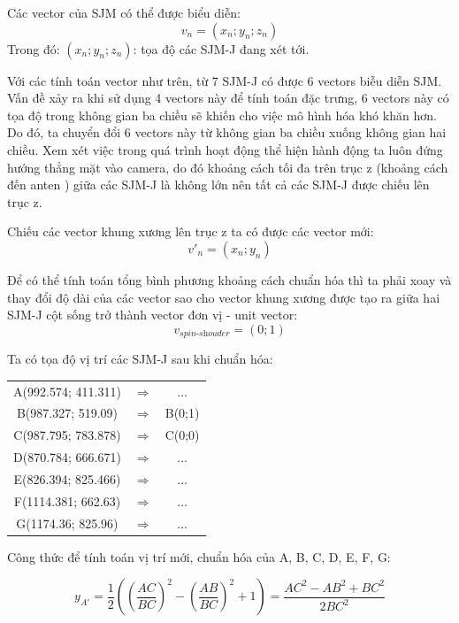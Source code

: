 Các vector của SJM có thể được biểu diễn:
\begin{equation}
v_n=(x_n; y_n; z_n)
\end{equation}
Trong đó: $(x_n; y_n; z_n)$: tọa độ các SJM-J đang xét tới.

Với các tính toán vector như trên, từ 7 SJM-J có được 6 vectors biễu diễn SJM. Vấn đề xảy ra khi sử dụng 4 vectors này để tính toán đặc trưng, 6 vectors này có tọa độ trong không gian ba chiều sẽ khiến cho việc mô hình hóa khó khăn hơn. Do đó, ta chuyển đổi 6 vectors này từ không gian ba chiều xuống không gian hai chiều. Xem xét việc trong quá trình hoạt động thể hiện hành động ta luôn đứng hướng thẳng mặt vào camera, do đó khoảng cách tối đa trên trục z (khoảng cách đến anten ) giữa các SJM-J là không lớn nên tất cả các SJM-J được chiếu lên trục z.

Chiếu các vector khung xương lên trục z ta có được các vector mới:
\begin{equation}
v'_n = ({x_n}; {y_n})
\end{equation}

Để có thể tính toán tổng bình phương khoảng cách chuẩn hóa thì ta phải xoay và thay đổi độ dài của các vector sao cho vector khung xương được tạo ra giữa hai SJM-J cột sống trở thành vector đơn vị - unit vector:
\begin{equation}
v_\textit{spin-shouder} = (0;1)
\end{equation}

Ta có tọa độ vị trí các SJM-J sau khi chuẩn hóa:\*

\begin{tabular}{c c c}
A(992.574; 411.311) & $\Rightarrow$ & ... \\ 
B(987.327; 519.09) & $\Rightarrow$ & B(0;1) \\ 
C(987.795; 783.878) & $\Rightarrow$ & C(0;0) \\ 
D(870.784; 666.671) & $\Rightarrow$ & ... \\ 
E(826.394; 825.466) & $\Rightarrow$ & ... \\ 
F(1114.381; 662.63) & $\Rightarrow$ & ... \\ 
G(1174.36; 825.96) & $\Rightarrow$ & ... \\ 
\end{tabular} \*

Công thức để tính toán vị trí mới, chuẩn hóa của A, B, C, D, E, F, G:

\begin{equation}
{y_{A'}} = \frac{1}{2}\left( {{{\left( {\frac{{AC}}{{BC}}} \right)}^2} - {{\left( {\frac{{AB}}{{BC}}} \right)}^2} + 1} \right) = \frac{{A{C^2} - A{B^2} + B{C^2}}}{{2B{C^2}}}
\end{equation}

